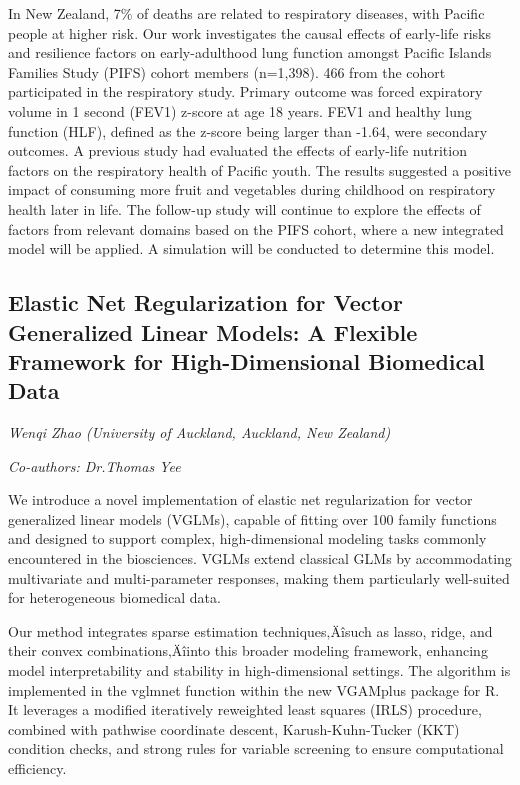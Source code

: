 \documentclass[
]{scrreprt}
\begin{document}
In New Zealand, 7\% of deaths are related to respiratory diseases, with
Pacific people at higher risk. Our work investigates the causal effects
of early-life risks and resilience factors on early-adulthood lung
function amongst Pacific Islands Families Study (PIFS) cohort members
(n=1,398). 466 from the cohort participated in the respiratory study.
Primary outcome was forced expiratory volume in 1 second (FEV1) z-score
at age 18 years. FEV1 and healthy lung function (HLF), defined as the
z-score being larger than -1.64, were secondary outcomes. A previous
study had evaluated the effects of early-life nutrition factors on the
respiratory health of Pacific youth. The results suggested a positive
impact of consuming more fruit and vegetables during childhood on
respiratory health later in life. The follow-up study will continue to
explore the effects of factors from relevant domains based on the PIFS
cohort, where a new integrated model will be applied. A simulation will
be conducted to determine this model.

\subsection{Elastic Net Regularization for Vector Generalized Linear
Models: A Flexible Framework for High-Dimensional Biomedical
Data}\label{elastic-net-regularization-for-vector-generalized-linear-models-a-flexible-framework-for-high-dimensional-biomedical-data}

\emph{Wenqi Zhao} \emph{(University of Auckland,
Auckland, New Zealand)}

\emph{Co-authors: Dr.Thomas Yee}

\setlength{\parskip}{0.5em}

We introduce a novel implementation of elastic net regularization for
vector generalized linear models (VGLMs), capable of fitting over 100
family functions and designed to support complex, high-dimensional
modeling tasks commonly encountered in the biosciences. VGLMs extend
classical GLMs by accommodating multivariate and multi-parameter
responses, making them particularly well-suited for heterogeneous
biomedical data.

Our method integrates sparse estimation techniques‚Äîsuch as lasso,
ridge, and their convex combinations‚Äîinto this broader modeling
framework, enhancing model interpretability and stability in
high-dimensional settings. The algorithm is implemented in the vglmnet
function within the new VGAMplus package for R. It leverages a modified
iteratively reweighted least squares (IRLS) procedure, combined with
pathwise coordinate descent, Karush-Kuhn-Tucker (KKT) condition checks,
and strong rules for variable screening to ensure computational
efficiency.
\end{document}
